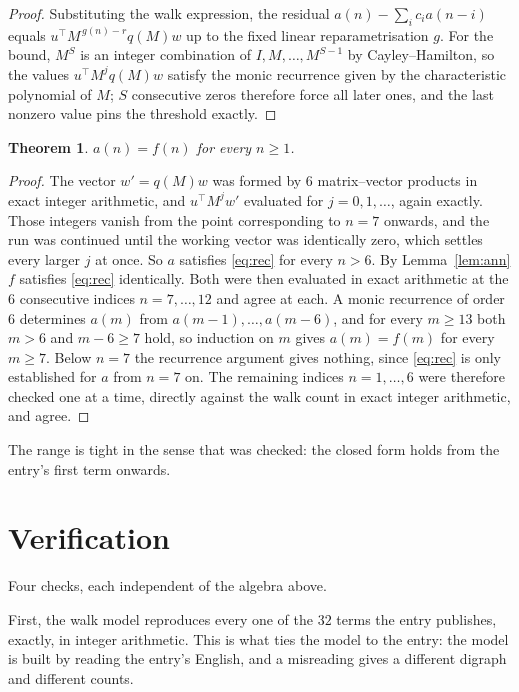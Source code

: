 \documentclass[11pt,a4paper]{article}
\theoremstyle{plain}
\newtheorem{theorem}{Theorem}
\theoremstyle{definition}
\begin{document}
\begin{proof}
Substituting the walk expression, the residual $a(n)-\sum_ic_ia(n-i)$ equals
$u^{\!\top}M^{\,g(n)-r}q(M)w$ up to the fixed linear reparametrisation $g$. For the bound,
$M^{S}$ is an integer combination of $I,M,\dots,M^{S-1}$ by Cayley--Hamilton, so the values
$u^{\!\top}M^{j}q(M)w$ satisfy the monic recurrence given by the characteristic polynomial of
$M$; $S$ consecutive zeros therefore force all later ones, and the last nonzero value pins the
threshold exactly.
\end{proof}

\begin{theorem}
$a(n)=f(n)$ for every $n\ge1$.
\end{theorem}

\begin{proof}
The vector $w'=q(M)w$ was formed by $6$ matrix--vector products in exact integer
arithmetic, and $u^{\!\top}M^{j}w'$ evaluated for $j=0,1,\dots$, again exactly. Those integers
vanish from the point corresponding to $n=7$ onwards, and the run was continued until the
working vector was identically zero, which settles every larger $j$ at once. So $a$ satisfies
\eqref{eq:rec} for every $n>6$. By Lemma~\ref{lem:ann} $f$ satisfies \eqref{eq:rec}
identically. Both were then evaluated in exact arithmetic at the $6$ consecutive indices
$n=7,\dots,12$ and agree at each. A monic recurrence of order $6$
determines $a(m)$ from $a(m-1),\dots,a(m-6)$, and for every $m\ge13$ both
$m>6$ and $m-6\ge7$ hold, so induction on $m$ gives $a(m)=f(m)$ for every
$m\ge7$.
Below $n=7$ the recurrence argument gives nothing, since \eqref{eq:rec} is only
established for $a$ from $n=7$ on. The remaining indices $n=1,\dots,6$ were
therefore checked one at a time, directly against the walk count in exact integer arithmetic,
and agree.
\end{proof}

The range is tight in the sense that was checked: the closed form holds from the entry's first term onwards.

\section{Verification}

Four checks, each independent of the algebra above.

First, the walk model reproduces every one of the $32$ terms the entry publishes,
exactly, in integer arithmetic. This is what ties the model to the entry: the model is built
by reading the entry's English, and a misreading gives a different digraph and different
counts.
\end{document}
